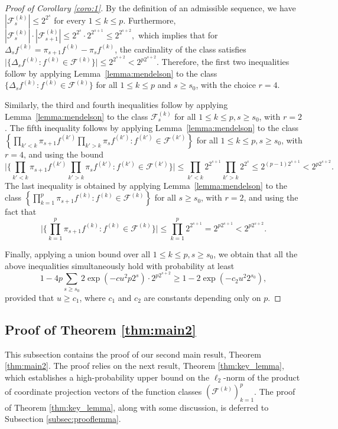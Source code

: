 \documentclass[numbers,webpdf,imaiai]{ima-authoring-template}
\theoremstyle{thmstyletwo}%
\numberwithin{equation}{section}
\numberwithin{equation}{section}
\newcommand{\F}{\mathcal{F}}
\begin{document}
\begin{proof}[Proof of Corollary \ref{coro:1}]
 By the definition of an admissible sequence, we have $|\F^{(k)}_s| \le 2^{2^s}$ for every $1\le k\le p$. Furthermore, $|\F^{(k)}_s|\cdot |\F^{(k)}_{s+1}| \le 2^{2^s} \cdot 2^{2^{s+1}}\le 2^{2^{s+2}},$ which implies that for $\Delta_s f^{(k)} = \pi_{s+1}f^{(k)}-\pi_s f^{(k)}$, the cardinality of the class satisfies $\big|\{\Delta_s f^{(k)}: f^{(k)} \in \F^{(k)} \}\big| \le 2^{2^{s+2}}< 2^{p2^{s+2}}$. Therefore, the first two inequalities follow by applying Lemma~\ref{lemma:mendelson} to the class $\{\Delta_s f^{(k)}:f^{(k)}\in \F^{(k)}\}$ for all $1\le k\le p$ and $s\ge s_0$, with the choice $r=4$. 
 
 Similarly, the third and fourth inequalities follow by applying Lemma~\ref{lemma:mendelson} to the class $\F^{(k)}_s$ for all $1\le k\le p, s\ge s_0$, with $r=2$. The fifth inequality follows by applying Lemma~\ref{lemma:mendelson} to the class $\left\{\prod_{k'<k}\pi_{s+1} f^{(k')}\prod_{k'>k}\pi_{s} f^{(k')}:f^{(k')}\in \F^{(k')}\right\}$ for all $1\le k\le p, s\ge s_0$, with $r=4$, and using the bound
 \[
 \bigg|\bigg\{\prod_{k'<k}\pi_{s+1} f^{(k')}\prod_{k'>k}\pi_{s} f^{(k')}:f^{(k')}\in \F^{(k')}\bigg\}\bigg|\le \prod_{k'<k} 2^{2^{s+1}} \prod_{k'>k} 2^{2^s}\le 2^{(p-1) 2^{s+1}}<2^{p2^{s+2}}.
 \]
 The last inequality is obtained by applying Lemma~\ref{lemma:mendelson} to the class $\left\{\prod_{k=1}^{p}\pi_{s+1}f^{(k)}:f^{(k)}\in \F^{(k)}\right\}$ for all $s\ge s_0$, with $r=2$, and using the fact that
 \[
\bigg| \bigg\{\prod_{k=1}^{p} \pi_{s+1} f^{(k)}:f^{(k)}\in \F^{(k)} \bigg\} \bigg| \le \prod_{k=1}^{p} 2^{2^{s+1}}=2^{p 2^{s+1}}<2^{p 2^{s+2}}.
 \]
 
 Finally, applying a union bound over all $1\le k\le p, s\ge s_0$, we obtain that all the above inequalities simultaneously hold with probability at least
 \[
 1-4p\sum_{s\ge s_0 }2\exp(-c u^2 p 2^{s})\cdot 2^{p 2^{s+2}}\ge 1-2\exp(-c_2 u^2 2^{s_0}),
 \]
provided that $u\ge c_1$, where $c_1$ and $c_2$ are constants depending only on $p$.
\end{proof}

\subsection{Proof of Theorem \ref{thm:main2}}\label{subsec:main2}
This subsection contains the proof of our second main result, Theorem \ref{thm:main2}. The proof relies on the next result, Theorem \ref{thm:key_lemma}, which establishes a high-probability upper bound on the $\ell_{2}$-norm of the product of coordinate projection vectors of the function classes $(\F^{(k)})_{k=1}^{p}$. The proof of Theorem \ref{thm:key_lemma}, along with some discussion, is deferred to Subsection \ref{subsec:prooflemma}.
\end{document}
